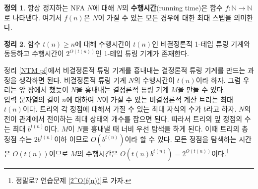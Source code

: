 \documentclass[b5paper, 11pt]{book}
\theoremstyle{definition}
\newtheorem{defn}{정의}[chapter]
\newtheorem{thm}[defn]{정리}
\newenvironment{pf*}{\pushQED{\qed}\pf}
{\popQED\endpf}
\begin{document}
\begin{defn}
    항상 정지하는 NFA $N$에 대해 $N$의 \textbf{수행시간}(running time)은 함수 $f: \mathbb{N}\rightarrow \mathbb{N}$로 나타낸다. 여기서 $f(n)$은 $N$이 가질 수 있는 모든 경우에 대한 최대 스텝을 의미한다. 
\end{defn}
\begin{thm}
    함수 $t(n) \ge n$에 대해 수행시간이 $t(n)$인 비결정론적 1-테입 튜링 기계와 동등하고 수행시간이 $2^{O(t(n))}$인 1-테입 튜링 기계가 존재한다. 
\end{thm}
\begin{pf*}
    정리 \ref{NTM pf}에서 비결정론적 튜링 기계를 흉내내는 결정론적 튜링 기계를 만드는 과정을 생각하면 된다. 비결정론적 튜링 기계 $N$의 수행시간이 $t(n)$이라 하자. 그럼 우리는 앞 장에서 했듯이 $N$을 흉내내는 결정론적 튜링 기계 $M$을 만들 수 있다. \\ 
    입력 문자열의 길이 $n$에 대하여 $N$이 가질 수 있는 비결정론적 계산 트리는 최대 $t(n)$이다. 트리의 각 정점에 대해서 가질 수 있는 최대 자식의 수가 $b$라고 하자. $N$의 전이 관계에서 전이하는 최대 상태의 개수를 잡으면 된다. 따라서 트리의 잎 정점의 수는 최대 $b^{t(n)}$이다. $M$이 $N$을 흉내낼 때 너비 우선 탐색을 하게 된다. 이때 트리의 총 정점 수는 $2b^{t(n)}$이하 이므로 $O(b^{t(n)})$이라 할 수 있다. 모든 정점을 탐색하는 시간은 $O(t(n))$이므로 $M$의 수행시간은 $O(t(n)b^{t(n)}) = 2^{O(t(n))}$이다.\footnote{정말로? 연습문제 \ref{2^O(f(n))}로 가자.}
\end{pf*}
\end{document}
